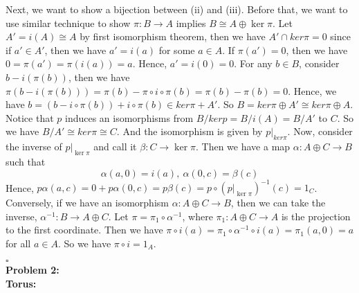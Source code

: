 \documentclass[12pt]{amsart}
\begin{document}
Next, we want to show a bijection between (ii) and (iii).
Before that, we want to use similar technique to show $\pi:B\to A$ implies $B\cong A\oplus\ker\pi$. Let $A'=i(A)\cong A$ by first isomorphism theorem, then we have $A'\cap ker\pi =0$ since if $a'\in A'$, then we have $a'=i(a)$ for some $a\in A$. If $\pi(a')=0$, then we have $0=\pi(a')=\pi(i(a))=a$. Hence, $a'=i(0)=0$. For any $b\in B$, consider $b-i(\pi(b))$, then we have $\pi(b-i(\pi(b)))=\pi(b)-\pi\circ i\circ \pi(b)=\pi(b)-\pi(b)=0$. Hence, we have $b=(b-i\circ \pi(b))+i\circ \pi(b)\in ker\pi+A'$. So $B=ker\pi\oplus A'\cong ker\pi\oplus A$. Notice that $p$ induces an isomorphisms from $B/kerp=B/i(A)=B/A'$ to $C$. So we have $B/A'\cong ker\pi\cong C$. And the isomorphism is given by $p|_{ker\pi}$. Now, consider the inverse of $p|_{\ker\pi}$ and call it $\beta:C\to \ker\pi$. Then we have a map $\alpha:A\oplus C\to B$ such that 
\[\alpha(a,0)=i(a),\ \alpha(0,c)=\beta(c)\]
Hence, $p\alpha(a,c)=0+p\alpha(0,c)=p\beta(c)=p\circ (p|_{\ker\pi})^{-1}(c)=1_C$.
Conversely, if we have an isomorphism $\alpha:A\oplus C\to B$, then we can take the inverse, $\alpha^{-1}:B\to A\oplus C$. Let $\pi= \pi_1\circ \alpha^{-1}$, where $\pi_1:A\oplus C\to A$ is the projection to the first coordinate. Then we have $\pi\circ i(a)=\pi_1\circ \alpha^{-1}\circ i(a)=\pi_1(a,0)=a$ for all $a\in A$. So we have $\pi\circ i=1_A$.

\phantom{qed}\hfill$\square$\\
\textbf{Problem 2:}\\
\textbf{Torus:}\hfill\\

\hfill\\
\hfill\\
\hfill\\
\hfill\\
\hfill\\
\hfill\\
\hfill\\
\hfill\\
\end{document}
